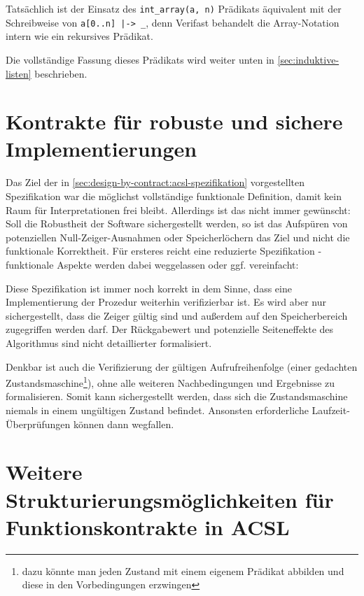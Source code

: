 Tatsächlich ist der Einsatz des \lstinline{int_array(a, n)} Prädikats äquivalent mit der Schreibweise 
von \lstinline{a[0..n] |-> _}, denn Verifast behandelt die Array-Notation intern wie ein rekursives
Prädikat.

Die vollständige Fassung dieses Prädikats wird weiter unten in \ref{sec:induktive-listen} beschrieben.



\section{Kontrakte für robuste und sichere Implementierungen}
\label{sec:design-by-contract:partielle-korrektheit}

Das Ziel der in \ref{sec:design-by-contract:acsl-spezifikation} vorgestellten Spezifikation war die
möglichst vollständige funktionale Definition, damit kein Raum für Interpretationen frei bleibt. Allerdings ist
das nicht immer gewünscht: Soll die Robustheit der Software sichergestellt werden, so ist das Aufspüren 
von potenziellen Null-Zeiger-Ausnahmen oder Speicherlöchern das Ziel und nicht die funktionale
Korrektheit. Für ersteres reicht eine reduzierte Spezifikation - funktionale Aspekte werden dabei 
weggelassen oder ggf. vereinfacht:


 
Diese Spezifikation ist immer noch korrekt in dem Sinne, dass eine Implementierung der Prozedur
weiterhin verifizierbar ist. Es wird aber nur sichergestellt, dass die Zeiger gültig sind und außerdem
auf den Speicherbereich zugegriffen werden darf. Der Rückgabewert und potenzielle Seiteneffekte des 
Algorithmus sind nicht detaillierter formalisiert.

Denkbar ist auch die Verifizierung der gültigen Aufrufreihenfolge (einer gedachten Zustandsmaschine\footnote{dazu
könnte man jeden Zustand mit einem eigenem Prädikat abbilden und diese in den Vorbedingungen erzwingen}),
ohne alle weiteren Nachbedingungen und Ergebnisse zu formalisieren. Somit kann sichergestellt werden,
dass sich die Zustandsmaschine niemals in einem ungültigen Zustand befindet. Ansonsten erforderliche
Laufzeit-Überprüfungen können dann wegfallen.



\section{Weitere Strukturierungsmöglichkeiten für Funktionskontrakte in ACSL}
\label{sec:design-by-contract:behaviors}

